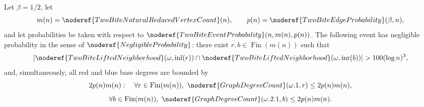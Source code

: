 \begin{helper}[FiberAndDegreeMixedLiftedIntersectionNegligible]
\label{helper:FiberAndDegreeMixedLiftedIntersectionNegligible}
Let \(\beta=1/2\), let
\[
m(n)=\noderef{TwoBiteNaturalReducedVertexCount}(n),
\qquad
p(n)=\noderef{TwoBiteEdgeProbability}(\beta,n),
\]
and let probabilities be taken with respect to
\(\noderef{TwoBiteEventProbability}(n,m(n),p(n))\).  The following event has
negligible probability in the sense of \(\noderef{NegligibleProbability}\):
there exist \(r,b\in\operatorname{Fin}(m(n))\) such that
\[
\left|
\noderef{TwoBiteLiftedNeighborhood}(\omega,\operatorname{inl}(r))
\cap
\noderef{TwoBiteLiftedNeighborhood}(\omega,\operatorname{inr}(b))
\right|
>100(\log n)^3,
\]
and, simultaneously, all red and blue base degrees are bounded by
\[
2p(n)m(n):
\quad
\forall r\in\operatorname{Fin}(m(n)),\ 
\noderef{GraphDegreeCount}(\omega.1,r)\le 2p(n)m(n),
\]
\[
\forall b\in\operatorname{Fin}(m(n)),\ 
\noderef{GraphDegreeCount}(\omega.2.1,b)\le 2p(n)m(n).
\]
\end{helper}

